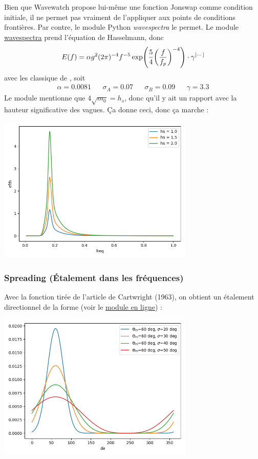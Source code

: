 \documentclass[10pt]{article}
\numberwithin{equation}{section}
\begin{document}
Bien que Wavewatch propose lui-même une fonction Jonswap comme condition initiale, il ne permet pas vraiment de l'appliquer aux points de conditions frontières. Par contre, le module Python \emph{wavespectra} le permet. Le module \href{https://wavespectra.readthedocs.io/en/latest/index.html}{wavespectra} prend l'équation de Hasselmann, donc
\begin{equation}
   E(f) = \alpha g^2(2\pi)^{-4} f^{-5} \exp(\frac{5}{4}\qty(\frac{f}{f_p})^{-4})\cdot\gamma^{[\cdots]}
\end{equation}
avec les classique de \Textcite{hasselmann1973measurements}, soit
\begin{align}
   && \alpha = 0.0081 && \sigma_A = 0.07 && \sigma_B = 0.09 && \gamma = 3.3 &&
\end{align}
Le module mentionne que \(4\sqrt{m_0} = h_s\), donc qu'il y ait un rapport avec la hauteur significative des vagues. Ça donne ceci, donc ça marche :
\begin{center}
\includegraphics[width=0.7\textwidth]{Figures/figures/jonswap-wavespectra.png}
\end{center}
\subsubsection{Spreading (Étalement dans les fréquences)}
\label{sec:orgb3b3a3d}

Avec la fonction tirée de l'article de Cartwright (1963), on obtient un étalement directionnel de la forme (voir le \href{https://wavespectra.readthedocs.io/en/latest/construction.html\#cartwright-symmetrical-spread}{module en ligne}) : 
\begin{center}
\includegraphics[width=0.7\textwidth]{Figures/figures/spreading.png}
\end{center}
\end{document}
